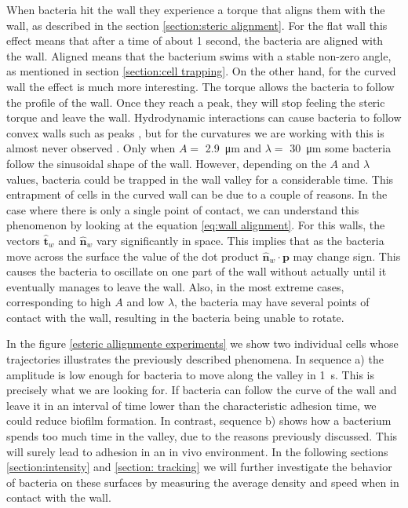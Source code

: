 When bacteria hit the wall they experience a torque that aligns them with the wall, as described in the section \ref{section:steric alignment}. For the flat wall this effect means that after a time of about 1 second, the bacteria are aligned with the wall. Aligned means that the bacterium swims with a stable non-zero angle, as mentioned in section \ref{section:cell trapping}. On the other hand, for the curved wall the effect is much more interesting. The torque allows the bacteria to follow the profile of the wall. Once they reach a peak, they will stop feeling the steric torque and leave the wall. Hydrodynamic interactions can cause bacteria to follow convex walls such as peaks \cite{Sipos2015HydrodynamicWalls}, but for the curvatures we are working with this is almost never observed . Only when $A=$ \SI{2.9}{\micro\meter} and $\lambda=$ \SI{30}{\micro\meter} some bacteria follow the sinusoidal shape of the wall. However, depending on the $A$ and $\lambda$ values, bacteria could be trapped in the wall valley for a considerable time. This entrapment of cells in the curved wall can be due to a couple of reasons. In the case where there is only a single point of contact, we can understand this phenomenon by looking at the equation \ref{eq:wall alignment}. For this walls, the vectors $\hat{\textbf{t}}_w$ and $\hat{\textbf{n}}_w$ vary significantly in space. This implies that as the bacteria move across the surface the value of the dot product $\hat{\textbf{n}}_w \cdot \textbf{p}$ may change sign. This causes the bacteria to oscillate on one part of the wall without actually until it eventually manages to leave the wall. Also, in the most extreme cases, corresponding to high $A$ and low $\lambda$, the bacteria may have several points of contact with the wall, resulting in the bacteria being unable to rotate. 

In the figure \ref{esteric allignmente experiments} we show two individual cells whose trajectories illustrates the previously described phenomena. In sequence a) the amplitude is low enough for bacteria to move along the valley in \SI{1}{\second}. This is precisely what we are looking for. If bacteria can follow the curve of the wall and leave it in an interval of time lower than the characteristic adhesion time, we could reduce biofilm formation. In contrast, sequence b) shows how a bacterium spends too much time in the valley, due to the reasons previously discussed. This will surely lead to adhesion in an in vivo environment. In the following sections \ref{section:intensity} and \ref{section: tracking} we will further investigate the behavior of bacteria on these surfaces by measuring the average density and speed when in contact with the wall. 



